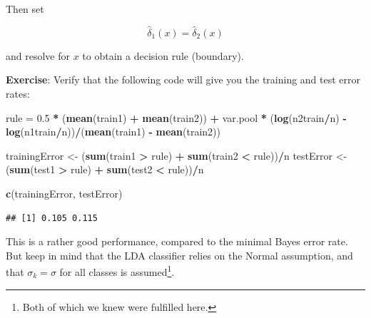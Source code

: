 \documentclass[
  10pt,
  ignorenonframetext,
]{beamer}
\newenvironment{Shaded}{\begin{snugshade}}{\end{snugshade}}
\newcommand{\FloatTok}[1]{\textcolor[rgb]{0.00,0.00,0.81}{#1}}
\newcommand{\FunctionTok}[1]{\textcolor[rgb]{0.13,0.29,0.53}{\textbf{#1}}}
\newcommand{\NormalTok}[1]{#1}
\newcommand{\OtherTok}[1]{\textcolor[rgb]{0.56,0.35,0.01}{#1}}
\newcommand{\SpecialCharTok}[1]{\textcolor[rgb]{0.81,0.36,0.00}{\textbf{#1}}}
\begin{document}
\begin{frame}[fragile]
Then set

\[\hat\delta_1(x) = \hat\delta_2(x)\]

and resolve for \(x\) to obtain a decision rule (boundary).

\vspace{2mm}

\textbf{Exercise}: Verify that the following code will give you the
training and test error rates:

\vspace{2mm}

\scriptsize

\begin{Shaded}
\begin{Highlighting}[]
\NormalTok{rule }\OtherTok{=} \FloatTok{0.5} \SpecialCharTok{*}\NormalTok{ (}\FunctionTok{mean}\NormalTok{(train1) }\SpecialCharTok{+} \FunctionTok{mean}\NormalTok{(train2)) }\SpecialCharTok{+}\NormalTok{ var.pool }\SpecialCharTok{*}\NormalTok{ (}\FunctionTok{log}\NormalTok{(n2train}\SpecialCharTok{/}\NormalTok{n) }\SpecialCharTok{{-}}
    \FunctionTok{log}\NormalTok{(n1train}\SpecialCharTok{/}\NormalTok{n))}\SpecialCharTok{/}\NormalTok{(}\FunctionTok{mean}\NormalTok{(train1) }\SpecialCharTok{{-}} \FunctionTok{mean}\NormalTok{(train2))}

\NormalTok{trainingError }\OtherTok{\textless{}{-}}\NormalTok{ (}\FunctionTok{sum}\NormalTok{(train1 }\SpecialCharTok{\textgreater{}}\NormalTok{ rule) }\SpecialCharTok{+} \FunctionTok{sum}\NormalTok{(train2 }\SpecialCharTok{\textless{}}\NormalTok{ rule))}\SpecialCharTok{/}\NormalTok{n}
\NormalTok{testError }\OtherTok{\textless{}{-}}\NormalTok{ (}\FunctionTok{sum}\NormalTok{(test1 }\SpecialCharTok{\textgreater{}}\NormalTok{ rule) }\SpecialCharTok{+} \FunctionTok{sum}\NormalTok{(test2 }\SpecialCharTok{\textless{}}\NormalTok{ rule))}\SpecialCharTok{/}\NormalTok{n}

\FunctionTok{c}\NormalTok{(trainingError, testError)}
\end{Highlighting}
\end{Shaded}

\begin{verbatim}
## [1] 0.105 0.115
\end{verbatim}

\normalsize

This is a rather good performance, compared to the minimal Bayes error
rate. But keep in mind that the LDA classifier relies on the Normal
assumption, and that \(\sigma_k=\sigma\) for all classes is
assumed\footnote{Both of which we knew were fulfilled here.}.
\end{frame}
\end{document}

